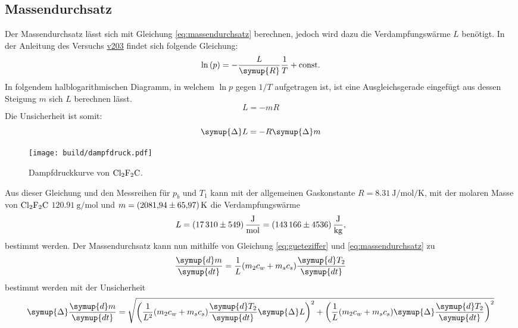 \subsection{Massendurchsatz}
Der Massendurchsatz lässt sich mit Gleichung \eqref{eq:massendurchsatz} berechnen, jedoch wird dazu die Verdampfungswärme
$L$ benötigt.
In der Anleitung des Versuchs \href{http://129.217.224.2/HOMEPAGE/PHYSIKER/BACHELOR/AP/SKRIPT/V203.pdf}{v203} findet sich
folgende Gleichung:
\begin{equation}
    \ln \left(p\right) = -\frac{L}{\symup{R}} \frac{1}{T} + \text{const.}
\end{equation}
In folgendem halblogarithmischen Diagramm, in welchem $\ln{p}$ gegen $1/T$ 
aufgetragen ist, ist eine Ausgleichsgerade eingefügt aus dessen Steigung $m$ sich $L$ berechnen 
lässt.
\begin{equation}
    L = -mR
\end{equation}
Die Unsicherheit ist somit:
\begin{equation}
    \symup{\Delta}L = -R\symup{\Delta}m
\end{equation}
\begin{figure}[H]
    \centering
    \texttt{[image: build/dampfdruck.pdf]}
    \caption{Dampfdruckkurve von $\ce{Cl2F2C}$.}
\end{figure}
%
\noindent Aus dieser Gleichung und den Messreihen für $p_b$ und $T_1$ kann mit der allgemeinen 
Gaskonstante \mbox{$R=\SI{8.31}{\joule\per\mole\per\kelvin}$}, mit der molaren Masse von $\ce{Cl2F2C}$ \mbox{$\SI{120.91}{\gram\per\mole}$\cite{molar}} 
und \mbox{$m = \SI{2081.94\pm65.97}{\kelvin}$} die Verdampfungswärme
\begin{equation*}
L=\SI{17310\pm549}{\joule\per\mole}=\SI{143166\pm4536}{\joule\per\kilogram},
\end{equation*}
bestimmt werden.
%
Der Massendurchsatz kann nun mithilfe von Gleichung \eqref{eq:gueteziffer} und \eqref{eq:massendurchsatz} 
zu
\begin{equation}
    \frac{\symup{d}m}{\symup{dt}} = \frac{1}{L}(m_2c_w + m_sc_s)\frac{\symup{d}T_2}{\symup{dt}}
\end{equation}
bestimmt werden mit der Unsicherheit
\begin{equation}
    \symup{\Delta}\frac{\symup{d}m}{\symup{dt}} = 
    \sqrt{
        \left(\frac{1}{L^2}(m_2c_w + m_sc_s)\frac{\symup{d}T_2}{\symup{dt}}\symup{\Delta}L\right)^2 + 
        \left(\frac{1}{L}(m_2c_w + m_sc_s)\symup{\Delta}\frac{\symup{d}T_2}{\symup{dt}}\right)^2
    }
\end{equation}
